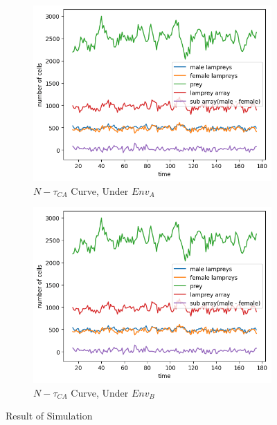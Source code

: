 \documentclass{mcmthesis}
\begin{document}
\begin{figure}[H]
  \centering
  \begin{subfigure}[b]{0.45\textwidth}
    \includegraphics[width=\textwidth]{figures/6_1_figur1.png}
    \caption{$N-\tau_{CA}$ Curve, Under $Env_{A}$}
    \label{fig:sub1}
  \end{subfigure}
  \hfill
  \begin{subfigure}[b]{0.45\textwidth}
    \includegraphics[width=\textwidth]{figures/6_1_figur1.png}
    \caption{$N-\tau_{CA}$ Curve, Under $Env_{B}$}
    \label{fig:sub2}
  \end{subfigure}
  
  \caption{Result of Simulation}
  \label{fig:Result of Simulation}
\end{figure}
\end{document}
